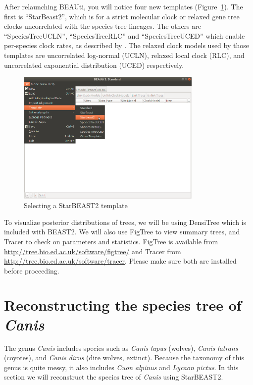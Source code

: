 \documentclass[12pt]{article}
\begin{document}
After relaunching BEAUti, you will notice four new templates (Figure~\ref{fig:strictClockTemplate}). The first
is ``StarBeast2'', which is for a strict molecular clock or relaxed
gene tree clocks uncorrelated with the species tree lineages. The others
are ``SpeciesTreeUCLN'', ``SpeciesTreeRLC'' and ``SpeciesTreeUCED'' which
enable per-species clock rates, as described by \cite{Ogilvie2016}.
The relaxed clock models used by those templates are uncorrelated log-normal (UCLN),
relaxed local clock (RLC), and uncorrelated exponential distribution (UCED)
respectively.

\begin{figure}[htb!]
\centering
\includegraphics[width=0.8\textwidth]{figures/strictClockTemplate.png}
\caption
{Selecting a StarBEAST2 template}
\label{fig:strictClockTemplate}
\end{figure}

To visualize posterior distributions of trees, we will be using DensiTree
\parencite{Bouckaert2010} which is included with BEAST2. We will also use
FigTree to view summary trees, and Tracer to check on parameters and
statistics. FigTree is available from \url{http://tree.bio.ed.ac.uk/software/figtree/}
and Tracer from \url{http://tree.bio.ed.ac.uk/software/tracer}. Please make sure both are
installed before proceeding.

\clearpage

\section{Reconstructing the species tree of \textit{Canis}}
\label{sec:speciesTree}

The genus \textit{Canis} includes species such as \textit{Canis lupus} (wolves),
\textit{Canis latrans} (coyotes), and \textit{Canis dirus} (dire wolves, extinct).
Because the
taxonomy of this genus is quite messy, it also includes
\textit{Cuon alpinus} and \textit{Lycaon pictus}.
In this section we will reconstruct the species tree of \textit{Canis} using StarBEAST2.
\end{document}
